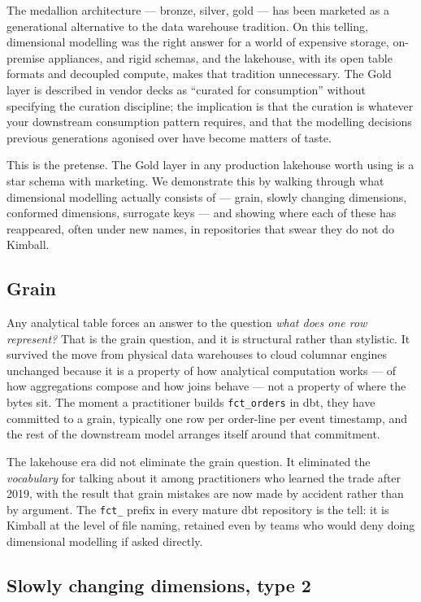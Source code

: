 \documentclass[11pt,a4paper]{article}
\begin{document}
The medallion architecture --- bronze, silver, gold --- has been marketed as a generational alternative to the data warehouse tradition. On this telling, dimensional modelling was the right answer for a world of expensive storage, on-premise appliances, and rigid schemas, and the lakehouse, with its open table formats and decoupled compute, makes that tradition unnecessary. The Gold layer is described in vendor decks as ``curated for consumption'' without specifying the curation discipline; the implication is that the curation is whatever your downstream consumption pattern requires, and that the modelling decisions previous generations agonised over have become matters of taste.

This is the pretense. The Gold layer in any production lakehouse worth using is a star schema with marketing. We demonstrate this by walking through what dimensional modelling actually consists of --- grain, slowly changing dimensions, conformed dimensions, surrogate keys --- and showing where each of these has reappeared, often under new names, in repositories that swear they do not do Kimball.

\subsection{Grain}

Any analytical table forces an answer to the question \emph{what does one row represent?} That is the grain question, and it is structural rather than stylistic. It survived the move from physical data warehouses to cloud columnar engines unchanged because it is a property of how analytical computation works --- of how aggregations compose and how joins behave --- not a property of where the bytes sit. The moment a practitioner builds \texttt{fct\_orders} in dbt, they have committed to a grain, typically one row per order-line per event timestamp, and the rest of the downstream model arranges itself around that commitment.

The lakehouse era did not eliminate the grain question. It eliminated the \emph{vocabulary} for talking about it among practitioners who learned the trade after 2019, with the result that grain mistakes are now made by accident rather than by argument. The \texttt{fct\_} prefix in every mature dbt repository is the tell: it is Kimball at the level of file naming, retained even by teams who would deny doing dimensional modelling if asked directly.

\subsection{Slowly changing dimensions, type 2}
\end{document}
